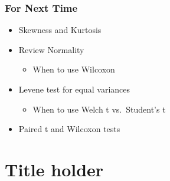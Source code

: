 \documentclass[
]{book}
\providecommand{\tightlist}{%
  \setlength{\itemsep}{0pt}\setlength{\parskip}{0pt}}
\begin{document}
\hypertarget{for-next-time}{%
\subsection{For Next Time}\label{for-next-time}}

\begin{itemize}
\tightlist
\item
  Skewness and Kurtosis
\item
  Review Normality

  \begin{itemize}
  \tightlist
  \item
    When to use Wilcoxon
  \end{itemize}
\item
  Levene test for equal variances

  \begin{itemize}
  \tightlist
  \item
    When to use Welch t vs.~Student's t
  \end{itemize}
\item
  Paired t and Wilcoxon tests
\end{itemize}

\hypertarget{title-holder}{%
\chapter*{Title holder}\label{title-holder}}

  
\end{document}
